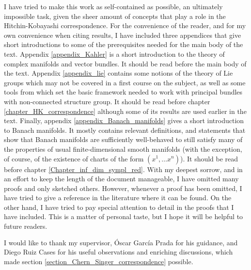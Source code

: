 I have tried to make this work as self-contained as possible, an ultimately impossible task, given the sheer amount of concepts that play a role in the Hitchin-Kobayashi correspondence. For the convenience of the reader, and for my own convenience when citing results, I have included three appendices that give short introductions to some of the prerequisites needed for the main body of the text. Appendix \ref{appendix_Kahler} is a short introduction to the theory of complex manifolds and vector bundles. It should be read before the main body of the text. Appendix \ref{appendix_lie} contains some notions of the theory of Lie groups which may not be covered in a first course on the subject, as well as some tools from \parencite{barajas2023non} which set the basic framework needed to work with principal bundles with non-connected structure group. It should be read before chapter \ref{chapter_HK_correspondence} although some of its results are used earlier in the text. Finally, appendix \ref{appendix_Banach_manifolds} gives a short introduction to Banach manifolds. It mostly contains relevant definitions, and statements that show that Banach manifolds are sufficiently well-behaved to still satisfy many of the properties of usual finite-dimensional smooth manifolds (with the exception, of course, of the existence of charts of the form \((x^1, \ldots x^n)\)). It should be read before chapter \ref{Chapter_inf_dim_sympl_red}. With my deepest sorrow, and in an effort to keep the length of the document manageable, I have omitted many proofs and only sketched others. However, whenever a proof has been omitted, I have tried to give a reference in the literature where it can be found. On the other hand, I have tried to pay special attention to detail in the proofs that I have included. This is a matter of personal taste, but I hope it will be helpful to future readers. 

I would like to thank my supervisor, Óscar García Prada for his guidance, and Diego Ruiz Cases for his useful observations and enriching discussions, which made section \ref{section_Chern_Singer_correspondence} possible.
